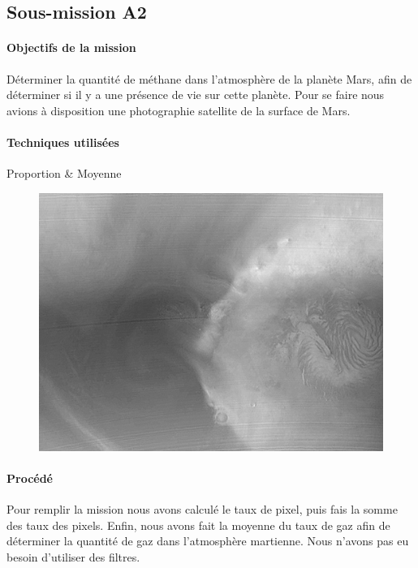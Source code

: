 	\subsection{Sous-mission A2}
	\begin{vwcol}[widths={0.65,0.2}, rule=0pt]
		\begin{minipage}{0.7\textwidth}
			\paragraph{Objectifs de la mission}

			Déterminer la quantité de méthane dans l'atmosphère de la planète Mars, afin de déterminer si il y a une présence de vie sur cette planète. Pour se faire nous avions à disposition une photographie satellite de la surface de Mars.
		\end{minipage}

		\begin{minipage}{0.3\textwidth}
			\begin{flushright}
				\paragraph{Techniques utilisées}
			
				Proportion \&
				Moyenne
			\end{flushright}
		\end{minipage}
	\end{vwcol} 

	\begin{figure}[h]
		\centering
		\includegraphics[scale=0.6]{images/Mars_surface.png}
	\end{figure}
	\vspace{-0.3cm}

	\paragraph{Procédé}	
		Pour remplir la mission nous avons calculé le taux de pixel, puis fais la somme des taux des pixels. Enfin, nous avons fait la moyenne du taux de gaz afin de déterminer la quantité de gaz dans l'atmosphère martienne. Nous n'avons pas eu besoin d'utiliser des filtres.